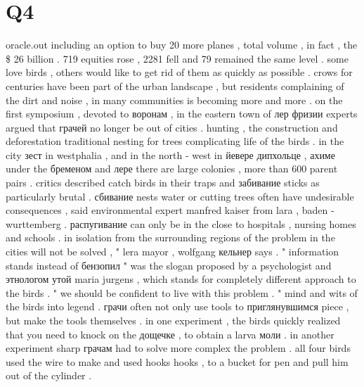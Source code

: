 \section*{Q4}

oracle.out 
including an option to buy 20 more planes , total volume , in fact , the \$ 26 billion .
719 equities rose , 2281 fell and 79 remained the same level .
some love birds , others would like to get rid of them as quickly as possible . crows for centuries have been part of the urban landscape , but residents complaining of the dirt and noise , in many communities is becoming more and more .
on the first symposium , devoted to воронам , in the eastern town of лер фризии experts argued that грачей no longer be out of cities .
hunting , the construction and deforestation traditional nesting for trees complicating life of the birds .
in the city зест in westphalia , and in the north - west in йевере дипхольце , ахиме under the бременом and лере there are large colonies , more than 600 parent pairs .
critics described catch birds in their traps and забивание sticks as particularly brutal .
сбивание nests water or cutting trees often have undesirable consequences , said environmental expert manfred kaiser from lara , baden - wurttemberg .
распугивание can only be in the close to hospitals , nursing homes and schools .
in isolation from the surrounding regions of the problem in the cities will not be solved , " lera mayor , wolfgang кельнер says .
" information stands instead of бензопил " was the slogan proposed by a psychologist and этнологом утой maria jurgens , which stands for completely different approach to the birds . " we should be confident to live with this problem . "
mind and wits of the birds into legend . грачи often not only use tools to приглянувшимся piece , but make the tools themselves .
in one experiment , the birds quickly realized that you need to knock on the дощечке , to obtain a larva моли .
in another experiment sharp грачам had to solve more complex the problem .
all four birds used the wire to make and used hooks hooks , to a bucket for pen and pull him out of the cylinder .

